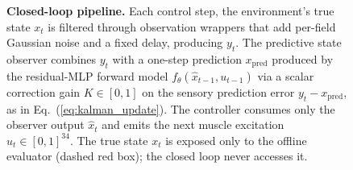 \documentclass[sn-mathphys,NameDate,iicol]{sn-jnl}
\begin{document}
\begin{figure}[t]
\caption[Closed-loop pipeline.]%
{\textbf{Closed-loop pipeline.} Each control step, the environment's true
state $x_t$ is filtered through observation wrappers that add
per-field Gaussian noise and a fixed delay, producing $y_t$. The
predictive state observer combines $y_t$ with a one-step
prediction $x_{\mathrm{pred}}$ produced by the residual-MLP forward
model $f_\theta(\hat x_{t-1}, u_{t-1})$ via a scalar correction gain
$K\!\in\![0,1]$ on the sensory prediction error $y_t - x_{\mathrm{pred}}$,
as in Eq.~(\ref{eq:kalman_update}). The controller consumes only the
observer output $\hat x_t$ and emits the next muscle excitation
$u_t\!\in\![0,1]^{34}$. The true state $x_t$ is exposed only to the
offline evaluator (dashed red box); the closed loop never accesses
it.}
\label{fig:system}
\end{figure}
\end{document}
